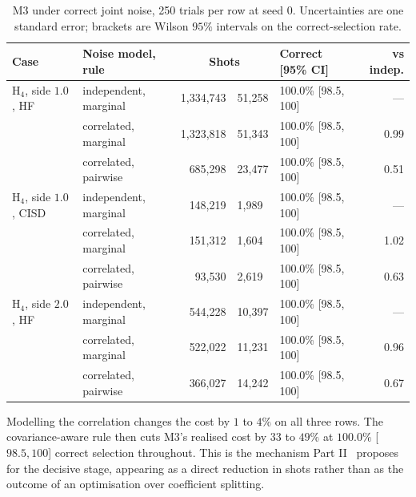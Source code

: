 \documentclass[10pt]{article}
\begin{document}
\begin{table}[!htbp]
\centering
\scriptsize
\caption{M3 under correct joint noise, 250 trials per row at seed $0$. Uncertainties are one standard error; brackets are Wilson $95\%$ intervals on the correct-selection rate.}
\label{tab:correlation}
\begin{tabular}{llr@{\,$\pm$\,}llr}
\toprule
Case & Noise model, rule & \multicolumn{2}{c}{Shots} & Correct [95\% CI] & vs indep. \\
\midrule
H$_4$, side $1.0$, HF & independent, marginal & 1,334,743 & 51,258 & 100.0\% [98.5, 100] & --- \\
 & correlated, marginal & 1,323,818 & 51,343 & 100.0\% [98.5, 100] & 0.99 \\
 & correlated, pairwise & 685,298 & 23,477 & 100.0\% [98.5, 100] & 0.51 \\
H$_4$, side $1.0$, CISD & independent, marginal & 148,219 & 1,989 & 100.0\% [98.5, 100] & --- \\
 & correlated, marginal & 151,312 & 1,604 & 100.0\% [98.5, 100] & 1.02 \\
 & correlated, pairwise & 93,530 & 2,619 & 100.0\% [98.5, 100] & 0.63 \\
H$_4$, side $2.0$, HF & independent, marginal & 544,228 & 10,397 & 100.0\% [98.5, 100] & --- \\
 & correlated, marginal & 522,022 & 11,231 & 100.0\% [98.5, 100] & 0.96 \\
 & correlated, pairwise & 366,027 & 14,242 & 100.0\% [98.5, 100] & 0.67 \\
\bottomrule
\end{tabular}
\end{table}

Modelling the correlation changes the cost by $1$ to $4\%$ on all three rows. The
covariance-aware rule then cuts M3's realised cost by $33$ to $49\%$ at $100.0\%$
[$98.5,100$] correct selection throughout. This is the mechanism
Part II~\cite{PartII} proposes for the decisive stage, appearing as a direct
reduction in shots rather than as the outcome of an optimisation over coefficient
splitting.
\end{document}
